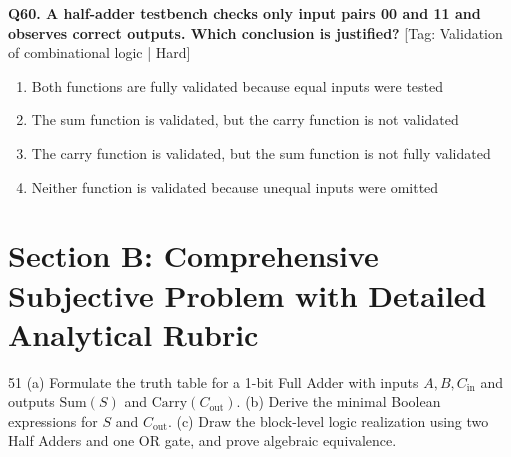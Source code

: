 \noindent\textbf{Q60. A half-adder testbench checks only input pairs 00 and 11 and observes correct outputs. Which conclusion is justified?} \hfill [Tag: Validation of combinational logic | Hard]
\begin{enumerate}[label=(\alph*),topsep=2pt,itemsep=1pt,partopsep=0pt,parsep=0pt]
    \item {Both functions are fully validated because equal inputs were tested}
    \item {The sum function is validated, but the carry function is not validated}
    \item {The carry function is validated, but the sum function is not fully validated}
    \item {Neither function is validated because unequal inputs were omitted}
\end{enumerate}
\vspace{2mm}


\newpage
\section{Section B: Comprehensive Subjective Problem with Detailed Analytical Rubric}

\begin{subjectiveq}{5}{1}
(a) Formulate the truth table for a 1-bit Full Adder with inputs $A, B, C_{\mathrm{in}}$ and outputs $\mathrm{Sum} (S)$ and $\mathrm{Carry} (C_{\mathrm{out}})$. (b) Derive the minimal Boolean expressions for $S$ and $C_{\mathrm{out}}$. (c) Draw the block-level logic realization using two Half Adders and one OR gate, and prove algebraic equivalence.
\end{subjectiveq}

